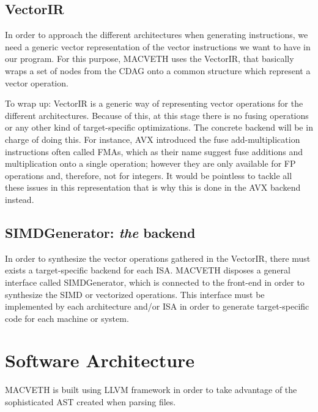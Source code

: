 \documentclass[a4paper,12pt]{memoir}
\begin{document}
\section{VectorIR}
In order to approach the different architectures when generating instructions,
we need a generic vector representation of the vector instructions we want to
have in our program. For this purpose, MACVETH uses the VectorIR, that basically
wraps a set of nodes from the CDAG onto a common structure which represent a vector operation.

To wrap up: VectorIR is a generic way of representing vector operations for the different
architectures. Because of this, at this stage there is no fusing operations or
any other kind of target-specific optimizations. The concrete backend will be in
charge of doing this. For instance, AVX introduced the fuse add-multiplication
instructions often called FMAs, which as their name suggest fuse additions and
multiplication onto a single operation; however they are only available for FP
operations and, therefore, not for integers. It would be pointless to tackle
all these issues in this representation that is why this is done in the AVX
backend instead.

\section{SIMDGenerator: \textit{the} backend}
In order to synthesize the vector operations gathered in the VectorIR, there
must exists a target-specific backend for each ISA. MACVETH disposes a general
interface called SIMDGenerator, which is connected to the front-end in order to
synthesize the SIMD or vectorized operations. This interface must be
implemented by each architecture and/or ISA in order to generate
target-specific code for each machine or system.



\newpage
\chapter{Software Architecture}
MACVETH is built using LLVM framework in order to take advantage of the
sophisticated AST created when parsing files.



\end{document}
